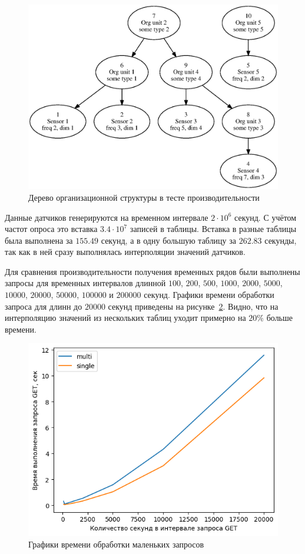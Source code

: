 \begin{figure}
    \includegraphics[scale=0.6]{img/bench.eps}
    \caption{Дерево организационной структуры в тесте производительности}
    \label{bench-graph}
\end{figure}

Данные датчиков генерируются на временном интервале $2 \cdot {10} ^ {6}$ секунд. С учётом частот опроса это вставка $3.4 \cdot {10} ^ {7}$ записей в таблицы. Вставка в разные таблицы была выполнена за $155.49$ секунд, а в одну большую таблицу за $262.83$ секунды, так как в ней сразу выполнялась интерполяции значений датчиков.

Для сравнения производительности получения временных рядов были выполнены запросы для временных интервалов длинной $100$, $200$, $500$, $1000$, $2000$, $5000$, $10000$, $20000$, $50000$, $100000$ и $200000$ секунд. Графики времени обработки запроса для длинн до $20000$ секунд приведены на рисунке~\ref{bench2e4}. Видно, что на интерполяцию значений из нескольких таблиц уходит примерно на $20\%$ больше времени.

\begin{figure}
    \includegraphics[scale=1.0]{img/bench2e4.png}
    \caption{Графики времени обработки маленьких запросов}
    \label{bench2e4}
\end{figure}

